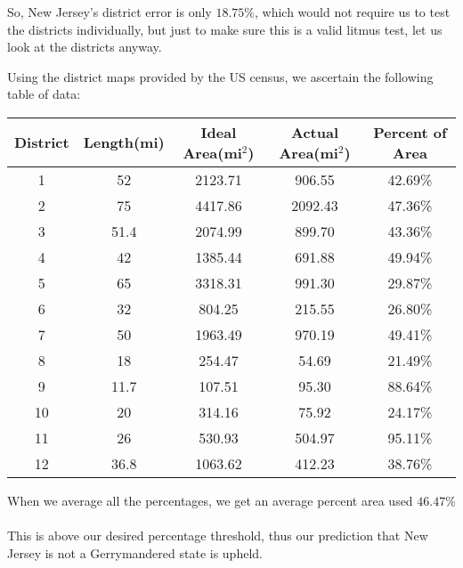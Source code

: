 \documentclass[12pt]{article}
\begin{document}
	So, New Jersey's district error is only $18.75\%$, which would not require us to test the districts individually, but just to make sure this is a valid litmus test, let us look at the districts anyway.
	
	Using the district maps provided by the US census, we ascertain the following table of data\cite{njdistrictdata}:
	\begin{center}
		\begin{tabular}{ c  c  c  c  c }
			
			\textbf{District} & 
			\textbf{Length(mi)} & \textbf{Ideal Area(mi$^2$)} & \textbf{Actual Area(mi$^2$)} & \textbf{Percent of Area} \\
			\hline
			1 & 52 & 2123.71 & 906.55 & 42.69\%\\
			
			2 & 75 & 4417.86 & 2092.43 & 47.36\%\\
			
			3 & 51.4 &  2074.99& 899.70 & 43.36\%\\
			
			4 & 42 & 1385.44 & 691.88 & 49.94\%\\
			
			5 & 65 & 3318.31 & 991.30 & 29.87\%\\
			
			6 & 32 & 804.25 & 215.55 & 26.80\%\\
			
			7 & 50 & 1963.49 & 970.19 & 49.41\%\\
			
			8 & 18 & 254.47 & 54.69 & 21.49\%\\
			
			9 & 11.7 & 107.51 & 95.30 & 88.64\%\\
			
			10 & 20 & 314.16 & 75.92 & 24.17\%\\
			
			11 & 26 & 530.93 & 504.97 & 95.11\%\\
			
			12 & 36.8 & 1063.62 & 412.23 & 38.76\%\\
			\hline
		\end{tabular}
	\end{center}
	
	\noindent
	When we average all the percentages, we get an average percent area used $46.47\%$
	\\ \\This is above our desired percentage threshold, thus our prediction that New Jersey is not a Gerrymandered state is upheld.
	
\end{document}
